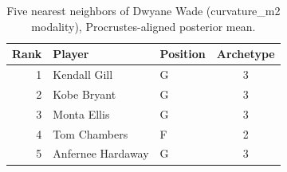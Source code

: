\begin{table}[htbp]
  \centering\small
  \begin{tabular}{rllc}
    \toprule
    Rank & Player & Position & Archetype \\
    \midrule
    1 & Kendall Gill & G & 3 \\
    2 & Kobe Bryant & G & 3 \\
    3 & Monta Ellis & G & 3 \\
    4 & Tom Chambers & F & 2 \\
    5 & Anfernee Hardaway & G & 3 \\
    \bottomrule
  \end{tabular}
  \caption{Five nearest neighbors of Dwyane Wade (curvature_m2 modality), Procrustes-aligned posterior mean.}
  \label{tab:Dwyane_Wade_neighbors_curvature_m2}
\end{table}

